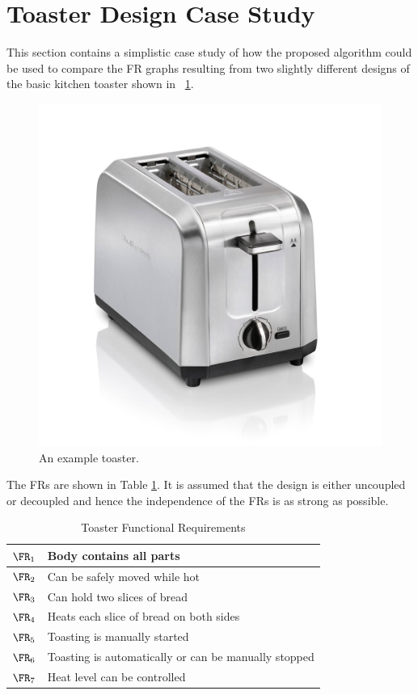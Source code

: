 \section{Toaster Design Case Study}

This section contains a simplistic case study of how the proposed algorithm could be used to compare the FR graphs
resulting from two slightly different designs of the basic kitchen toaster shown in \figurename~\ref{fig:toaster}.

\begin{figure}[H]
  \begin{center}
    \includegraphics[scale=0.2]{toaster}
  \end{center}
  \caption{An example toaster.}
  \label{fig:toaster}
\end{figure}

The FRs are shown in Table \ref{toasterfrs}.  It is assumed that the design is either uncoupled or decoupled and
hence the independence of the FRs is as strong as possible.

\begin{table}[H]
  \centering
  \caption{Toaster Functional Requirements}
  \label{toasterfrs}
  \begin{tabular}{|c|l|}
    \hline
    \(\FR_1\) & Body contains all parts \\
    \hline
    \(\FR_2\) & Can be safely moved while hot \\
    \hline
    \(\FR_3\) & Can hold two slices of bread \\
    \hline
    \(\FR_4\) & Heats each slice of bread on both sides \\
    \hline
    \(\FR_5\) & Toasting is manually started \\
    \hline
    \(\FR_6\) & Toasting is automatically or can be manually stopped \\
    \hline
    \(\FR_7\) & Heat level can be controlled \\
    \hline
  \end{tabular}
\end{table}

